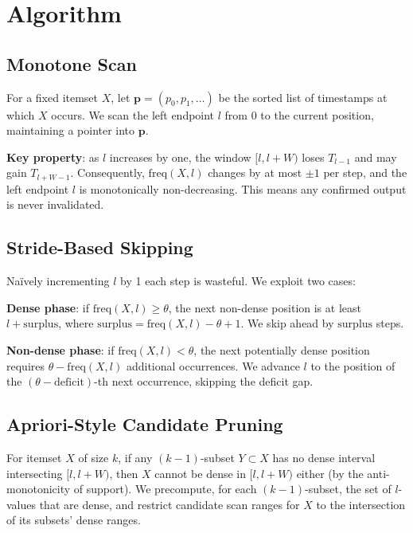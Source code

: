 \section{Algorithm}

\subsection{Monotone Scan}

For a fixed itemset $X$, let $\mathbf{p} = (p_0, p_1, \ldots)$ be the sorted
list of timestamps at which $X$ occurs.
We scan the left endpoint $l$ from $0$ to the current position,
maintaining a pointer into $\mathbf{p}$.

\textbf{Key property}: as $l$ increases by one, the window $[l, l+W)$
loses $T_{l-1}$ and may gain $T_{l+W-1}$.
Consequently, $\mathrm{freq}(X, l)$ changes by at most $\pm 1$ per step,
and the left endpoint $l$ is monotonically non-decreasing.
This means any confirmed output is never invalidated.

\subsection{Stride-Based Skipping}

Na\"ively incrementing $l$ by 1 each step is wasteful.
We exploit two cases:

\textbf{Dense phase}: if $\mathrm{freq}(X, l) \geq \theta$,
the next non-dense position is at least $l + \mathrm{surplus}$, where
$\mathrm{surplus} = \mathrm{freq}(X, l) - \theta + 1$.
We skip ahead by $\mathrm{surplus}$ steps.

\textbf{Non-dense phase}: if $\mathrm{freq}(X, l) < \theta$,
the next potentially dense position requires
$\theta - \mathrm{freq}(X, l)$ additional occurrences.
We advance $l$ to the position of the $(\theta - \mathrm{deficit})$-th
next occurrence, skipping the deficit gap.

\subsection{Apriori-Style Candidate Pruning}

For itemset $X$ of size $k$, if any $(k{-}1)$-subset $Y \subset X$
has no dense interval intersecting $[l, l+W)$, then $X$ cannot be
dense in $[l, l+W)$ either (by the anti-monotonicity of support).
We precompute, for each $(k{-}1)$-subset, the set of $l$-values that
are dense, and restrict candidate scan ranges for $X$ to the
intersection of its subsets' dense ranges.

